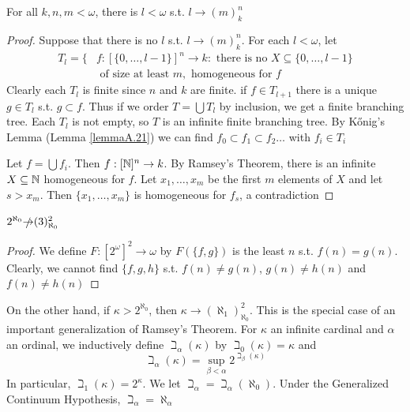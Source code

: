 \documentclass[11pt]{article}
\begin{document}
\begin{theorem}
For all \(k,n,m<\omega\), there is \(l<\omega\) s.t. \(l\to(m)^n_k\)
\end{theorem}

\begin{proof}
Suppose that there is no \(l\) s.t. \(l\to (m)_k^n\). For each \(l<\omega\),
let
\begin{align*}
T_l=\{&f:[\{0,\dots,l-1\}]^n\to k:\text{ there is no }X\subseteq\{0,\dots,l-1\}\\
&\text{ of size at least }m, \text{ homogeneous for }f
\end{align*}
Clearly each \(T_l\) is finite since \(n\) and \(k\) are finite. if \(f\in T_{l+1}\) there is a
unique \(g\in T_l\) s.t. \(g\subset f\). Thus if we order \(T=\bigcup T_l\) by inclusion, we get a finite
branching tree. Each \(T_l\) is not empty, so \(T\) is an infinite finite branching tree. By
Kőnig's Lemma (Lemma \ref{lemmaA.21}) we can find \(f_0\subset f_1\subset f_2\dots\) with \(f_i\in T_i\)

Let \(f=\bigcup f_i\). Then \(f:[\mathbb{N}]^n\to k\). By Ramsey's Theorem, there is an infinite \(X\subseteq\mathbb{N}\)
homogeneous for \(f\). Let \(x_1,\dots,x_m\) be the first \(m\) elements of \(X\) and let \(s>x_m\).
Then \(\{x_1,\dots,x_m\}\) is homogeneous for \(f_s\), a contradiction
\end{proof}

\begin{proposition}[]
\(2^{\aleph_0}\slashed{\to}(3)^2_{\aleph_0}\)
\end{proposition}

\begin{proof}
We define \(F:[2^\omega]^2\to\omega\) by \(F(\{f,g\})\) is the least \(n\) s.t. \(f(n)=g(n)\). Clearly, we
cannot find \(\{f,g,h\}\) s.t. \(f(n)\neq g(n)\), \(g(n)\neq h(n)\) and \(f(n)\neq h(n)\)
\end{proof}

On the other hand, if \(\kappa>2^{\aleph_0}\), then \(\kappa\to(\aleph_1)_{\aleph_0}^2\). This is the special case of an
important generalization of Ramsey's Theorem. For \(\kappa\) an infinite cardinal and \(\alpha\) an ordinal, we
inductively define \(\beth_\alpha(\kappa)\) by \(\beth_0(\kappa)=\kappa\) and
\begin{equation*}
\beth_\alpha(\kappa)=\sup_{\beta<\alpha}2^{\beth_\beta(\kappa)}
\end{equation*}
In particular, \(\beth_1(\kappa)=2^\kappa\). We let \(\beth_\alpha=\beth_\alpha(\aleph_0)\). Under the Generalized Continuum
Hypothesis, \(\beth_\alpha=\aleph_\alpha\)
\end{document}
